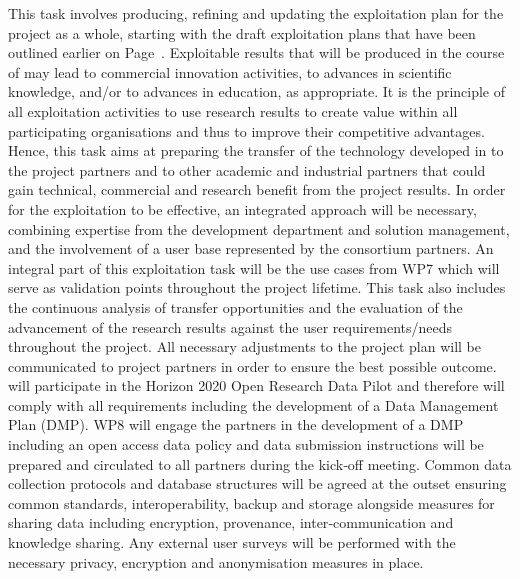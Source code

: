 \begin{Workpackage}{\thewpno}
\begin{Task}
This task involves producing, refining and updating the exploitation plan for the project as a whole, starting with the draft exploitation plans that have been outlined earlier on Page~\pageref{sect:exploitation-plan}.
Exploitable results that will be produced in the course of \TheProject may lead to commercial innovation activities, to advances in scientific knowledge, and/or to advances in education, as appropriate.
It is the principle of all exploitation activities to use research results to create value within all participating organisations and thus to improve their competitive advantages.
\taskbreak
Hence, this task aims at preparing the transfer of the technology developed in \TheProject{} to the project partners and to other academic and industrial partners that could gain technical, commercial and research benefit from the project results. 
In order for the exploitation to be effective, an integrated approach will be necessary, combining expertise from the development department and solution management, and the involvement of a user base represented by the consortium partners. 
An integral part of this exploitation task will be the \TheProject{} use cases from WP7 which will serve as validation points throughout the project lifetime.
This task also includes the continuous analysis of transfer opportunities and the evaluation of the advancement of the research results against the user requirements/needs throughout the project.
All necessary adjustments to the project plan will be communicated to project partners  in order to ensure the best possible outcome. \TheProject{} will participate in the Horizon 2020 Open Research Data Pilot and therefore will comply with all
requirements including the development of a Data Management Plan (DMP). WP8 will engage the \TheProject{}
partners in the development of a DMP including an open access data policy and data submission instructions will
be prepared and circulated to all partners during the kick‐off meeting. Common data collection protocols and database structures will be agreed at the outset ensuring common
standards, interoperability, backup and storage alongside measures for sharing data including 
encryption, provenance, inter‐communication and knowledge sharing. Any external user surveys will be performed
with the necessary privacy, encryption and anonymisation measures in place.
\end{Task}

\begin{Task}



\end{Task}
\end{Workpackage}
